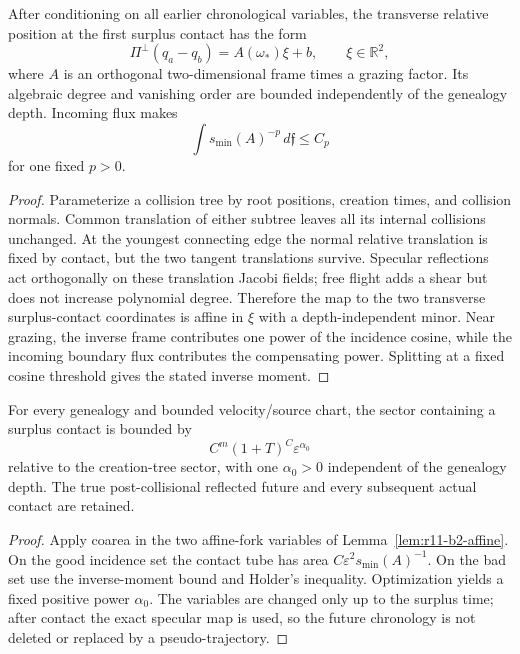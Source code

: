 \begin{lemma}
\label{lem:r11-b2-affine}
After conditioning on all earlier chronological variables, the transverse
relative position at the first surplus contact has the form
\[
 \Pi^\perp(q_a-q_b)=A(\omega_*)\xi+b,
 \qquad \xi\in\mathbb R^2,
\]
where $A$ is an orthogonal two-dimensional frame times a grazing factor.
Its algebraic degree and vanishing order are bounded independently of the
genealogy depth.  Incoming flux makes
\[
 \int s_{\min}(A)^{-p}\,d\mathfrak f\le C_p
\]
for one fixed $p>0$.
\end{lemma}

\begin{proof}
Parameterize a collision tree by root positions, creation times, and collision
normals.  Common translation of either subtree leaves all its internal
collisions unchanged.  At the youngest connecting edge the normal relative
translation is fixed by contact, but the two tangent translations survive.
Specular reflections act orthogonally on these translation Jacobi fields; free
flight adds a shear but does not increase polynomial degree.  Therefore the
map to the two transverse surplus-contact coordinates is affine in $\xi$
with a depth-independent minor.  Near grazing, the inverse frame contributes
one power of the incidence cosine, while the incoming boundary flux contributes
the compensating power.  Splitting at a fixed cosine threshold gives the
stated inverse moment.
\end{proof}

\begin{theorem}
\label{thm:r11-b2-surplus}
For every genealogy and bounded velocity/source chart, the sector containing a
surplus contact is bounded by
\[
 C^m(1+T)^C\varepsilon^{\alpha_0}
\]
relative to the creation-tree sector, with one $\alpha_0>0$ independent of
the genealogy depth.  The true post-collisional reflected future and every
subsequent actual contact are retained.
\end{theorem}

\begin{proof}
Apply coarea in the two affine-fork variables of
Lemma~\ref{lem:r11-b2-affine}.  On the good incidence set the contact tube has
area $C\varepsilon^2s_{\min}(A)^{-1}$.  On the bad set use the inverse-moment
bound and Holder's inequality.  Optimization yields a fixed positive power
$\alpha_0$.  The variables are changed only up to the surplus time; after
contact the exact specular map is used, so the future chronology is not
deleted or replaced by a pseudo-trajectory.
\end{proof}

